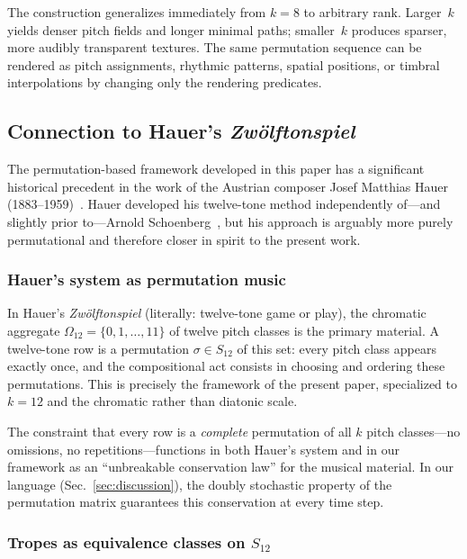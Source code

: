 \documentclass[
  twocolumn,
  aps,
  pra,
  showkeys,
  amsmath,amssymb,
  longbibliography
]{revtex4-2}
\begin{document}
The construction generalizes immediately from $k=8$ to
arbitrary rank.
Larger~$k$ yields denser pitch fields and longer minimal paths;
smaller~$k$ produces sparser, more audibly transparent
textures.
The same permutation sequence can be rendered as pitch
assignments, rhythmic patterns, spatial positions, or timbral
interpolations by changing only the rendering predicates.

\subsection{Connection to Hauer's \emph{Zw\"olftonspiel}}
\label{sec:hauer}

The permutation-based framework developed in this paper has a
significant historical precedent in the work of the Austrian
composer Josef Matthias Hauer
(1883--1959)~\cite{hauer-25,hauer-26,sengstschmid-80}.
Hauer developed his twelve-tone method independently of---and
slightly prior to---Arnold
Schoenberg~\cite{schoenberg-75,wille-76}, but his approach is
arguably more purely permutational and therefore closer in
spirit to the present work.

\subsubsection{Hauer's system as permutation music}

In Hauer's \emph{Zw\"olftonspiel} (literally: twelve-tone game
or play), the chromatic aggregate $\Omega_{12}=\{0,1,\ldots,11\}$
of twelve pitch classes is the primary material.
A twelve-tone row is a permutation $\sigma\in S_{12}$ of this
set: every pitch class appears exactly once, and the
compositional act consists in choosing and ordering these
permutations.
This is precisely the framework of the present paper,
specialized to $k=12$ and the chromatic rather than diatonic
scale.

The constraint that every row is a \emph{complete} permutation
of all $k$ pitch classes---no omissions, no
repetitions---functions in both Hauer's system and in our
framework as an ``unbreakable conservation law'' for the
musical material.
In our language (Sec.~\ref{sec:discussion}), the doubly
stochastic property of the permutation matrix guarantees this
conservation at every time step.

\subsubsection{Tropes as equivalence classes on $S_{12}$}
\end{document}
